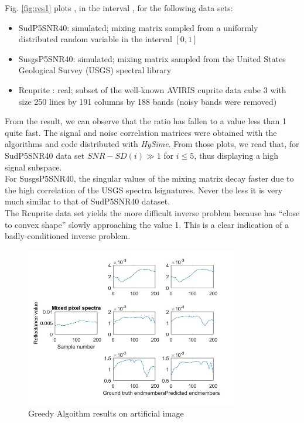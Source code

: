 \documentclass[12pt]{svproc}
\begin{document}
Fig. \ref{fig:res1} plots , in the interval , for the following data sets:
\begin{itemize}
	\item SudP5SNR40: simulated; mixing matrix sampled from a uniformly distributed random variable in the interval $[0,1]$
	\item SusgsP5SNR40: simulated; mixing matrix sampled from the United States Geological Survey (USGS) spectral library
	\item Rcuprite : real; subset of the well-known AVIRIS cuprite data cube 3 with size 250 lines by 191 columns by 188 bands (noisy bands were removed)
\end{itemize} 

From the result, we can observe that the ratio has fallen to a value less than 1 quite fast.
The signal and noise correlation matrices were obtained with the
algorithms and code distributed with \emph{HySime}. From those plots, we read that, for SudP5SNR40 data set $SNR-SD(i) \gg 1$  for $i\leq5$, thus displaying a high signal subspace.\\

For SusgsP5SNR40, the singular values of the mixing matrix decay faster due to the high correlation of the USGS spectra lsignatures. Never the less it is very much similar to that of SudP5SNR40 dataset.\\

The Rcuprite data set yields the more difficult inverse problem
because has “close to convex shape” slowly approaching the value 1. This is a clear indication of a badly-conditioned inverse problem.\\


\begin{figure}{}
	\centering
	\includegraphics[width=0.8\linewidth, height=7cm]{Picture7} 
	\caption{ Greedy Algoithm results on artificial image }
	\label{fig:res2}
\end{figure}
\end{document}
